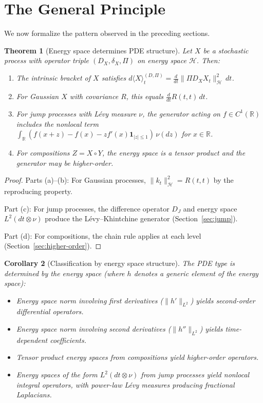 \documentclass[12pt]{article}
\theoremstyle{plain}
\newtheorem{theorem}{Theorem}[section]
\newtheorem{corollary}[theorem]{Corollary}
\theoremstyle{definition}
\theoremstyle{remark}
\newcommand{\R}{\mathbb{R}}
\newcommand{\HH}{\mathcal{H}}
\begin{document}
\section{The General Principle}\label{sec:general}

We now formalize the pattern observed in the preceding sections.

\begin{theorem}[Energy space determines PDE structure]\label{thm:general}
Let $X$ be a stochastic process with operator triple $(D_X, \delta_X, \Pi)$ on energy space $\HH$. Then:
\begin{enumerate}[label=(\alph*)]
\item The intrinsic bracket of $X$ satisfies $d\langle X \rangle_t^{(D,\Pi)} = \frac{d}{dt}\|\Pi D_X X_t\|_{\HH}^2 \, dt$.
\item For Gaussian $X$ with covariance $R$, this equals $\frac{d}{dt}R(t,t) \, dt$.
\item For jump processes with L\'{e}vy measure $\nu$, the generator acting on $f \in C^1(\R)$ includes the nonlocal term $\int_{\R} (f(x+z) - f(x) - zf'(x)\mathbf{1}_{|z| \leq 1}) \, \nu(dz)$ for $x \in \R$.
\item For compositions $Z = X \circ Y$, the energy space is a tensor product and the generator may be higher-order.
\end{enumerate}
\end{theorem}

\begin{proof}
Parts (a)--(b): For Gaussian processes, $\|k_t\|_{\HH}^2 = R(t,t)$ by the reproducing property.

Part (c): For jump processes, the difference operator $D_J$ and energy space $L^2(dt \otimes \nu)$ produce the L\'{e}vy--Khintchine generator (Section~\ref{sec:jump}).

Part (d): For compositions, the chain rule applies at each level (Section~\ref{sec:higher-order}).
\end{proof}

\begin{corollary}[Classification by energy space structure]\label{cor:classification}
The PDE type is determined by the energy space (where $h$ denotes a generic element of the energy space):
\begin{itemize}
\item Energy space norm involving first derivatives ($\|h'\|_{L^2}$) yields second-order differential operators.
\item Energy space norm involving second derivatives ($\|h''\|_{L^2}$) yields time-dependent coefficients.
\item Tensor product energy spaces from compositions yield higher-order operators.
\item Energy spaces of the form $L^2(dt \otimes \nu)$ from jump processes yield nonlocal integral operators, with power-law L\'{e}vy measures producing fractional Laplacians.
\end{itemize}
\end{corollary}
\end{document}
